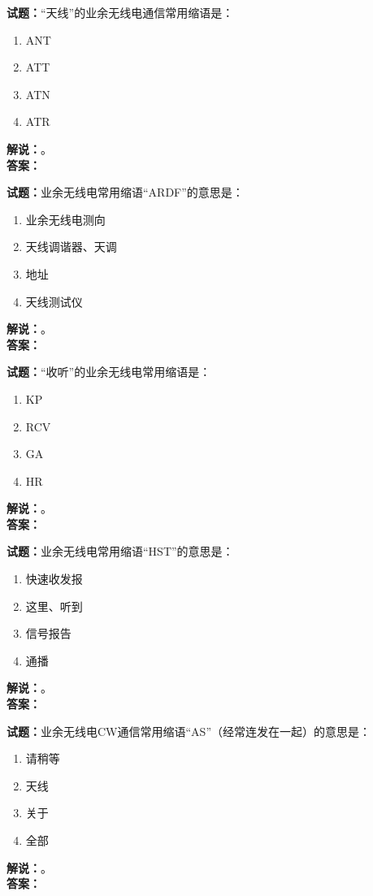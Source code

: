 \documentclass{ctexbook}
\begin{document}
\bigskip

\noindent\textbf{试题：}“天线”的业余无线电通信常用缩语是：
\begin{enumerate}[leftmargin=3em]
  \item ANT
  \item ATT
  \item ATN
  \item ATR
\end{enumerate}
\noindent\textbf{解说：}\textbf{}。\\\noindent\textbf{答案：}

\bigskip

\noindent\textbf{试题：}业余无线电常用缩语“ARDF”的意思是：
\begin{enumerate}[leftmargin=3em]
  \item 业余无线电测向
  \item 天线调谐器、天调
  \item 地址
  \item 天线测试仪
\end{enumerate}
\noindent\textbf{解说：}\textbf{}。\\\noindent\textbf{答案：}

\bigskip

\noindent\textbf{试题：}“收听”的业余无线电常用缩语是：
\begin{enumerate}[leftmargin=3em]
  \item KP
  \item RCV
  \item GA
  \item HR
\end{enumerate}
\noindent\textbf{解说：}\textbf{}。\\\noindent\textbf{答案：}

\bigskip

\noindent\textbf{试题：}业余无线电常用缩语“HST”的意思是：
\begin{enumerate}[leftmargin=3em]
  \item 快速收发报
  \item 这里、听到
  \item 信号报告
  \item 通播
\end{enumerate}
\noindent\textbf{解说：}\textbf{}。\\\noindent\textbf{答案：}

\bigskip

\noindent\textbf{试题：}业余无线电CW通信常用缩语“AS”（经常连发在一起）的意思是：
\begin{enumerate}[leftmargin=3em]
  \item 请稍等
  \item 天线
  \item 关于
  \item 全部
\end{enumerate}
\noindent\textbf{解说：}\textbf{}。\\\noindent\textbf{答案：}
\end{document}

